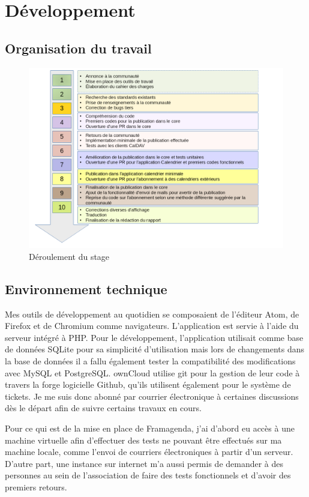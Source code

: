 \documentclass[10pt,a4paper, twoside]{report}
\begin{document}
	\chapter{Développement}
	\section{Organisation du travail}
	\begin{figure}[ht]
		\centering
		\centerline{\includegraphics[width=1.45\textwidth]{images/deroulement.png}}
		\caption*{Déroulement du stage}
		\label{normal_case}
	\end{figure}
	
	\section{Environnement technique}
	Mes outils de développement au quotidien se composaient de l'éditeur Atom, de Firefox et de Chromium comme navigateurs. L'application est servie à l'aide du serveur intégré à PHP. Pour le développement, l'application utilisait comme base de données SQLite pour sa simplicité d'utilisation mais lors de changements dans la base de données il a fallu également tester la compatibilité des modifications avec MySQL et PostgreSQL.
	ownCloud utilise git pour la gestion de leur code à travers la forge logicielle Github, qu'ils utilisent également pour le système de tickets. Je me suis donc abonné par courrier électronique à certaines discussions dès le départ afin de suivre certains travaux en cours.
	
	Pour ce qui est de la mise en place de Framagenda, j'ai d'abord eu accès à une machine virtuelle afin d'effectuer des tests ne pouvant être effectués sur ma machine locale, comme l'envoi de courriers électroniques à partir d'un serveur. D'autre part, une instance sur internet m'a aussi permis de demander à des personnes au sein de l'association de faire des tests fonctionnels et d'avoir des premiers retours.
	
\end{document}
